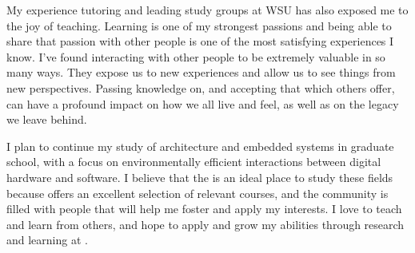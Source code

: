 My experience tutoring and leading study groups at WSU has also exposed me to the joy of teaching. Learning
is one of my strongest passions and being able to share that passion with other people is one of the 
most satisfying experiences I know. I've found interacting with other people to be extremely valuable in so many ways.
They expose us to new experiences and allow us to see things from new perspectives. Passing knowledge on,
and accepting that which others offer, can have a profound impact on how we all live and feel, as well as on the legacy
we leave behind. 

I plan to continue my study of architecture and embedded systems in graduate school, with a focus on
environmentally efficient interactions between digital hardware and software. I believe that the \university
is an ideal place to study these fields because \uni offers an excellent selection of relevant courses, 
and the community is filled with people that will help me foster and apply my interests. I love to teach and 
learn from others, and hope to apply and grow my abilities through research and learning at \uni.


